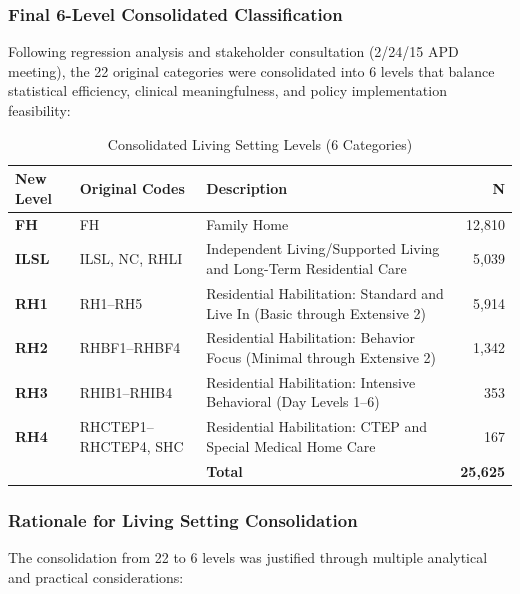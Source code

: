 \subsubsection{Final 6-Level Consolidated Classification}

Following regression analysis and stakeholder consultation (2/24/15 APD meeting), the 22 original categories were consolidated into 6 levels that balance statistical efficiency, clinical meaningfulness, and policy implementation feasibility:

\begin{table}[H]
\centering
\caption{Consolidated Living Setting Levels (6 Categories)}
\begin{tabular}{llp{7cm}r}
\toprule
\textbf{New Level} & \textbf{Original Codes} & \textbf{Description} & \textbf{N} \\
\midrule
\textbf{FH} & FH & Family Home & 12,810 \\
\midrule
\textbf{ILSL} & ILSL, NC, RHLI & Independent Living/Supported Living and Long-Term Residential Care & 5,039 \\
\midrule
\textbf{RH1} & RH1--RH5 & Residential Habilitation: Standard and Live In (Basic through Extensive 2) & 5,914 \\
\midrule
\textbf{RH2} & RHBF1--RHBF4 & Residential Habilitation: Behavior Focus (Minimal through Extensive 2) & 1,342 \\
\midrule
\textbf{RH3} & RHIB1--RHIB4 & Residential Habilitation: Intensive Behavioral (Day Levels 1--6) & 353 \\
\midrule
\textbf{RH4} & RHCTEP1--RHCTEP4, SHC & Residential Habilitation: CTEP and Special Medical Home Care & 167 \\
\midrule
& & \textbf{Total} & \textbf{25,625} \\
\bottomrule
\end{tabular}
\label{tab:consolidated-living-setting}
\end{table}

\subsubsection{Rationale for Living Setting Consolidation}

The consolidation from 22 to 6 levels was justified through multiple analytical and practical considerations:

